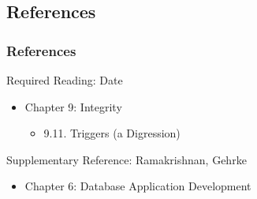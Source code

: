 \documentclass[dvipsnames]{beamer}
\theoremstyle{plain}
\begin{document}
%
%
%
%
%
%
%
%

\subsection*{References}

\begin{frame}
  \frametitle{References}

  \begin{block}{Required Reading: Date}
    \begin{itemize}

      \item Chapter 9: Integrity
      \begin{itemize}
        \item 9.11. \alert{Triggers (a Digression)}
      \end{itemize}
    \end{itemize}
  \end{block}

  \begin{block}{Supplementary Reference: Ramakrishnan, Gehrke}
    \begin{itemize}
      \item Chapter 6: Database Application Development
    \end{itemize}
  \end{block}
\end{frame}
\end{document}
